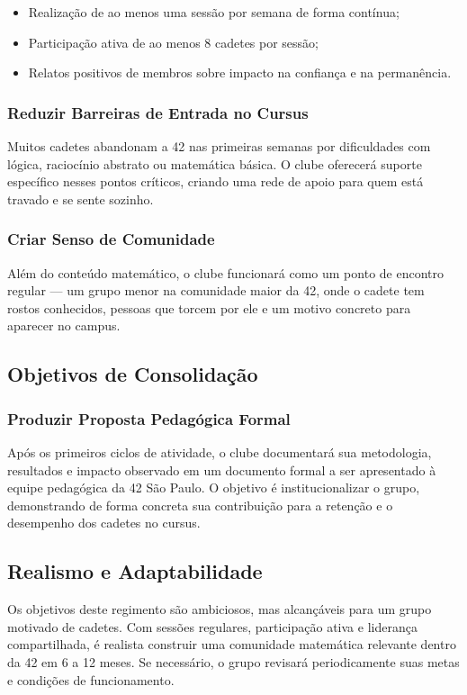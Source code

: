 \begin{itemize}
  \item Realização de ao menos uma sessão por semana de forma contínua;
  \item Participação ativa de ao menos 8 cadetes por sessão;
  \item Relatos positivos de membros sobre impacto na confiança e na permanência.
\end{itemize}

\subsubsection{Reduzir Barreiras de Entrada no Cursus}

Muitos cadetes abandonam a 42 nas primeiras semanas por dificuldades com lógica, raciocínio
abstrato ou matemática básica. O clube oferecerá suporte específico nesses pontos críticos,
criando uma rede de apoio para quem está travado e se sente sozinho.

\subsubsection{Criar Senso de Comunidade}

Além do conteúdo matemático, o clube funcionará como um ponto de encontro regular --- um
grupo menor na comunidade maior da 42, onde o cadete tem rostos conhecidos, pessoas
que torcem por ele e um motivo concreto para aparecer no campus.

\subsection{Objetivos de Consolidação}

\subsubsection{Produzir Proposta Pedagógica Formal}

Após os primeiros ciclos de atividade, o clube documentará sua metodologia, resultados e
impacto observado em um documento formal a ser apresentado à equipe pedagógica da 42 São
Paulo. O objetivo é institucionalizar o grupo, demonstrando de forma concreta sua
contribuição para a retenção e o desempenho dos cadetes no cursus.

\subsection{Realismo e Adaptabilidade}

Os objetivos deste regimento são ambiciosos, mas alcançáveis para um grupo motivado de
cadetes. Com sessões regulares, participação ativa e liderança compartilhada, é realista
construir uma comunidade matemática relevante dentro da 42 em 6 a 12 meses. Se necessário,
o grupo revisará periodicamente suas metas e condições de funcionamento.
